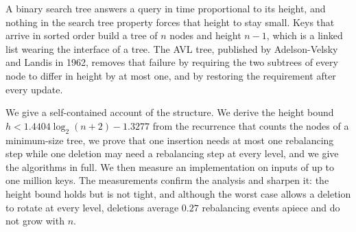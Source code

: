 A binary search tree answers a query in time proportional to its height, and
nothing in the search tree property forces that height to stay small. Keys that
arrive in sorted order build a tree of $n$ nodes and height $n-1$, which is a
linked list wearing the interface of a tree. The AVL tree, published by
Adelson-Velsky and Landis in 1962, removes that failure by requiring the two
subtrees of every node to differ in height by at most one, and by restoring the
requirement after every update.

We give a self-contained account of the structure. We derive the height bound
$h < 1.4404\log_2(n+2) - 1.3277$ from the recurrence that counts the nodes of a
minimum-size tree, we prove that one insertion needs at most one rebalancing
step while one deletion may need a rebalancing step at every level, and we give
the algorithms in full. We then measure an implementation on inputs of up to one
million keys. The measurements confirm the analysis and sharpen it: the height
bound holds but is not tight, and although the worst case allows a deletion to
rotate at every level, deletions average $0.27$ rebalancing events apiece and do
not grow with $n$.
